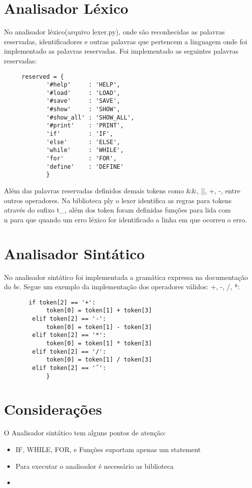 \documentclass[12pt]{article}
\begin{document}
\section{Analisador Léxico}

No analisador léxico(arquivo lexer.py), onde são reconhecidas as palavras reservadas, identificadores e outras palavras que pertencem a linguagem onde foi implementado as palavras reservadas.
Foi implementado as seguintes palavras reservadas:

\begin{verbatim}
     reserved = {
            '#help'     : 'HELP',
            '#load'     : 'LOAD',
            '#save'     : 'SAVE',
            '#show'     : 'SHOW',
            '#show_all' : 'SHOW_ALL',
            '#print'    : 'PRINT',
            'if'        : 'IF',
            'else'      : 'ELSE',
            'while'     : 'WHILE',
            'for'       : 'FOR',
            'define'    : 'DEFINE'
            }
\end{verbatim}

Além das palavras reservadas definidos demais tokens como \&\&, ||, +, -, entre outros operadores. Na biblioteca ply o lexer identifica as regras para tokens através do sufixo t\_, além dos token foram definidas funções para lida com \\n para que quando um erro léxico for identificado a linha em que ocorreu o erro.


\section{Analisador Sintático}

No analisador sintático foi implementada a gramática expressa na documentação do $bc$.
Segue um exemplo da implementação dos operadores válidos: +, -, /, *: 

\begin{verbatim}
       if token[2] == '+':
            token[0] = token[1] + token[3]
        elif token[2] == '-':
            token[0] = token[1] - token[3]
        elif token[2] == '*':
            token[0] = token[1] * token[3]
        elif token[2] == '/':
            token[0] = token[1] / token[3]
        elif token[2] == 'ˆ':
            }
\end{verbatim}


\section{Considerações}

 O Analisador sintático tem alguns pontos de atenção:
 \begin{itemize}
     \item IF, WHILE, FOR, e Funções suportam apenas um statement
     \item Para executar o analisador é necessário as biblioteca
     \item
 \end{itemize}
   
\end{document}
